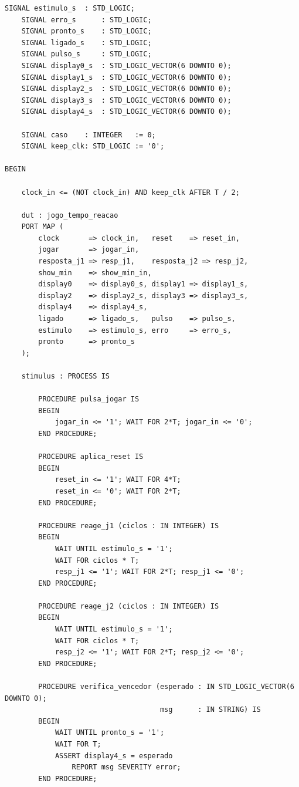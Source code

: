 \documentclass[12pt,a4paper]{article}
\begin{document}
\begin{lstlisting}[caption={Bancada de testes -- \texttt{jogo\_tempo\_reacao\_tb.vhd}},
                   label={lst:tb}]
    SIGNAL estimulo_s  : STD_LOGIC;
    SIGNAL erro_s      : STD_LOGIC;
    SIGNAL pronto_s    : STD_LOGIC;
    SIGNAL ligado_s    : STD_LOGIC;
    SIGNAL pulso_s     : STD_LOGIC;
    SIGNAL display0_s  : STD_LOGIC_VECTOR(6 DOWNTO 0);
    SIGNAL display1_s  : STD_LOGIC_VECTOR(6 DOWNTO 0);
    SIGNAL display2_s  : STD_LOGIC_VECTOR(6 DOWNTO 0);
    SIGNAL display3_s  : STD_LOGIC_VECTOR(6 DOWNTO 0);
    SIGNAL display4_s  : STD_LOGIC_VECTOR(6 DOWNTO 0);

    SIGNAL caso    : INTEGER   := 0;
    SIGNAL keep_clk: STD_LOGIC := '0';

BEGIN

    clock_in <= (NOT clock_in) AND keep_clk AFTER T / 2;

    dut : jogo_tempo_reacao
    PORT MAP (
        clock       => clock_in,   reset    => reset_in,
        jogar       => jogar_in,
        resposta_j1 => resp_j1,    resposta_j2 => resp_j2,
        show_min    => show_min_in,
        display0    => display0_s, display1 => display1_s,
        display2    => display2_s, display3 => display3_s,
        display4    => display4_s,
        ligado      => ligado_s,   pulso    => pulso_s,
        estimulo    => estimulo_s, erro     => erro_s,
        pronto      => pronto_s
    );

    stimulus : PROCESS IS

        PROCEDURE pulsa_jogar IS
        BEGIN
            jogar_in <= '1'; WAIT FOR 2*T; jogar_in <= '0';
        END PROCEDURE;

        PROCEDURE aplica_reset IS
        BEGIN
            reset_in <= '1'; WAIT FOR 4*T;
            reset_in <= '0'; WAIT FOR 2*T;
        END PROCEDURE;

        PROCEDURE reage_j1 (ciclos : IN INTEGER) IS
        BEGIN
            WAIT UNTIL estimulo_s = '1';
            WAIT FOR ciclos * T;
            resp_j1 <= '1'; WAIT FOR 2*T; resp_j1 <= '0';
        END PROCEDURE;

        PROCEDURE reage_j2 (ciclos : IN INTEGER) IS
        BEGIN
            WAIT UNTIL estimulo_s = '1';
            WAIT FOR ciclos * T;
            resp_j2 <= '1'; WAIT FOR 2*T; resp_j2 <= '0';
        END PROCEDURE;

        PROCEDURE verifica_vencedor (esperado : IN STD_LOGIC_VECTOR(6 DOWNTO 0);
                                     msg      : IN STRING) IS
        BEGIN
            WAIT UNTIL pronto_s = '1';
            WAIT FOR T;
            ASSERT display4_s = esperado
                REPORT msg SEVERITY error;
        END PROCEDURE;


\end{lstlisting}
\end{document}
